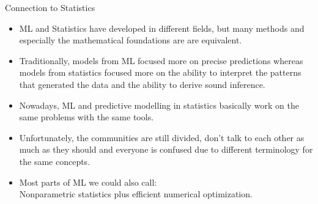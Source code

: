\documentclass[11pt,compress,t,notes=noshow, xcolor=table]{beamer}
\begin{document}
\begin{frame}{Connection to Statistics}


\begin{itemize}
	\item ML and Statistics have developed in different fields, but many
      methods and especially the mathematical foundations are are equivalent.
	\item Traditionally, models from ML focused more on precise predictions whereas models from statistics focused more on the ability to interpret the patterns that generated the data and the ability to derive sound inference.
	\item Nowadays, ML and predictive modelling in statistics basically work on the same problems with the same tools.
    \item Unfortunately, the communities are still divided, don't talk to each other as much as they should and everyone is confused due to different terminology for the same concepts.
    \item Most parts of ML we could also call:\\Nonparametric statistics plus efficient numerical optimization.
\end{itemize}

\end{frame}


\end{document}
